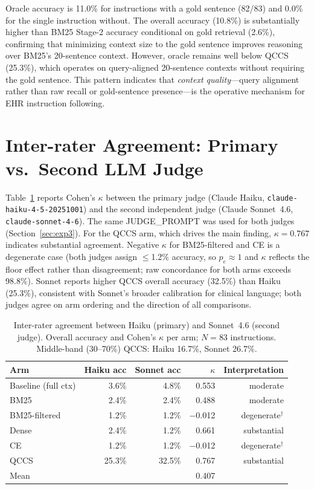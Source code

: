 \documentclass{article}
\begin{document}
Oracle accuracy is 11.0\% for instructions with a gold sentence (82/83) and
0.0\% for the single instruction without. The overall accuracy (10.8\%) is
substantially higher than BM25 Stage-2 accuracy conditional on gold retrieval
(2.6\%), confirming that minimizing context size to the gold sentence
improves reasoning over BM25's 20-sentence context. However, oracle remains
well below QCCS (25.3\%), which operates on query-aligned 20-sentence contexts
without requiring the gold sentence. This pattern indicates that \emph{context
quality}---query alignment rather than raw recall or gold-sentence
presence---is the operative mechanism for EHR instruction following.


\section{Inter-rater Agreement: Primary vs.\ Second LLM Judge}
\label{app:kappa}

Table~\ref{tab:kappa} reports Cohen's $\kappa$ between the primary judge
(Claude Haiku, \texttt{claude-haiku-4-5-20251001}) and the second independent
judge (Claude Sonnet~4.6, \texttt{claude-sonnet-4-6}). The same JUDGE\_PROMPT
was used for both judges (Section~\ref{sec:exp3}). For the QCCS arm, which
drives the main finding, $\kappa = 0.767$ indicates substantial agreement.
Negative $\kappa$ for BM25-filtered and CE is a degenerate case (both judges
assign $\leq$1.2\% accuracy, so $p_e \approx 1$ and $\kappa$ reflects the
floor effect rather than disagreement; raw concordance for both arms exceeds
98.8\%). Sonnet reports higher QCCS overall accuracy (32.5\%) than Haiku
(25.3\%), consistent with Sonnet's broader calibration for clinical language;
both judges agree on arm ordering and the direction of all comparisons.

\begin{table}[H]
\centering
\caption{Inter-rater agreement between Haiku (primary) and Sonnet~4.6 (second judge).
  Overall accuracy and Cohen's $\kappa$ per arm; $N{=}83$ instructions.
  Middle-band (30--70\%) QCCS: Haiku 16.7\%, Sonnet 26.7\%.}
\label{tab:kappa}
\small
\begin{tabular}{@{}lrrrr@{}}
\toprule
Arm & Haiku acc & Sonnet acc & $\kappa$ & Interpretation \\
\midrule
Baseline (full ctx) & 3.6\% & 4.8\% & 0.553 & moderate \\
BM25           & 2.4\% & 2.4\% & 0.488 & moderate \\
BM25-filtered  & 1.2\% & 1.2\% & $-$0.012 & degenerate$^\dagger$ \\
Dense          & 2.4\% & 1.2\% & 0.661 & substantial \\
CE             & 1.2\% & 1.2\% & $-$0.012 & degenerate$^\dagger$ \\
QCCS           & 25.3\% & 32.5\% & 0.767 & substantial \\
\midrule
Mean & & & 0.407 & \\
\bottomrule
\end{tabular}
\end{table}
\end{document}
